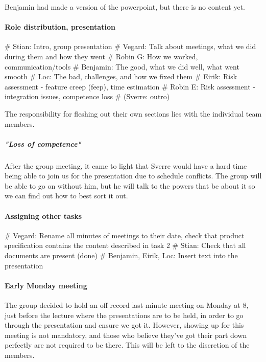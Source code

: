 \documentclass{article}
\begin{document}
Benjamin had made a version of the powerpoint, but there is no content yet.

\paragraph{Role distribution, presentation}

\begin{easylist}[itemize]
        # Stian: Intro, group presentation
        # Vegard: Talk about meetings, what we did during them and how they went
        # Robin G: How we worked, communication/tools
        # Benjamin: The good, what we did well, what went smooth
        # Loc: The bad, challenges, and how we fixed them
        # Eirik: Risk assessment - feature creep (feep), time estimation
        # Robin E: Risk assessment - integration issues, competence loss
        # (Sverre: outro)
\end{easylist}

The responsibility for fleshing out their own sections lies with the individual team members.

\subparagraph{"Loss of competence"}

After the group meeting, it came to light that Sverre would have a hard time being able to join us for the presentation due to schedule conflicts. The group will be able to go on without him, but he will talk to the powers that be about it so we can find out how to best sort it out.

\paragraph{Assigning other tasks}

\begin{easylist}[itemize]
    # Vegard: Rename all minutes of meetings to their date, check that product specification contains the content described in task 2
    # Stian: Check that all documents are present (done)
    # Benjamin, Eirik, Loc: Insert text into the presentation
\end{easylist}

\paragraph{Early Monday meeting}

The group decided to hold an off record last-minute meeting on Monday at 8, just before the lecture where the presentations are to be held, in order to go through the presentation and ensure we got it. However, showing up for this meeting is not mandatory, and those who believe they've got their part down perfectly are not required to be there. This will be left to the discretion of the members.
\end{document}

